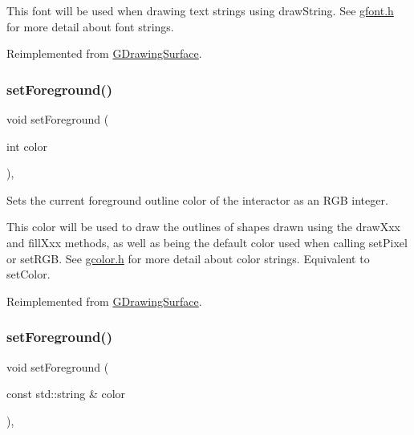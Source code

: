 This font will be used when drawing text strings using draw\+String. See \mbox{\hyperlink{gfont_8h_source}{gfont.\+h}} for more detail about font strings. 

Reimplemented from \mbox{\hyperlink{classsgl_1_1GDrawingSurface_a8e096e8818d838aceae1d46d58fb3a7b}{G\+Drawing\+Surface}}.

\mbox{\label{classsgl_1_1GCanvas_a59f7cd2bd1708c12dfa52a8f7c7b79c9}} 
\subsubsection{\texorpdfstring{set\+Foreground()}{setForeground()}\hspace{0.1cm}{\footnotesize\ttfamily [1/2]}}
{\footnotesize\ttfamily void set\+Foreground (\begin{DoxyParamCaption}\item[{int}]{color }\end{DoxyParamCaption})\hspace{0.3cm}{\ttfamily [override]}, {\ttfamily [virtual]}}



Sets the current foreground outline color of the interactor as an R\+GB integer. 

This color will be used to draw the outlines of shapes drawn using the draw\+Xxx and fill\+Xxx methods, as well as being the default color used when calling set\+Pixel or set\+R\+GB. See \mbox{\hyperlink{gcolor_8h_source}{gcolor.\+h}} for more detail about color strings. Equivalent to set\+Color. 

Reimplemented from \mbox{\hyperlink{classsgl_1_1GDrawingSurface_a7daa57084b5811b598fce8726660b328}{G\+Drawing\+Surface}}.

\mbox{\label{classsgl_1_1GCanvas_a8afbcf1f47750fb4c717f9ff36540235}} 
\subsubsection{\texorpdfstring{set\+Foreground()}{setForeground()}\hspace{0.1cm}{\footnotesize\ttfamily [2/2]}}
{\footnotesize\ttfamily void set\+Foreground (\begin{DoxyParamCaption}\item[{const std\+::string \&}]{color }\end{DoxyParamCaption})\hspace{0.3cm}{\ttfamily [override]}, {\ttfamily [virtual]}}



